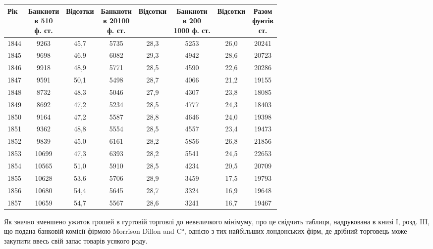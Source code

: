 
\begin{table}[h]
  \small
  \begin{tabular}{l c c c c c c c}
  \toprule
Рік  &  \makecell{Банкноти\\ в 5\textendash{}10 \\ф. ст.} & Відсотки  &
\makecell{Банкноти\\ в 20\textendash{}100\\ ф. ст.} & Відсотки  &  \makecell{Банкноти\\ в 200\textendash{}\\1000
ф. ст.} & Відсотки &   \makecell{Разом\\  фунтів \\ ст.} \\
  \midrule
1844    &     \phantom{0}9263  &  45,7  &  5735 & 28,3 & 5253 &   26,0 &   20241\\
1845    &     \phantom{0}9698  &  46,9  &  6082 & 29,3 & 4942 &   28,6 &   20723\\
1846    &     \phantom{0}9918  &  48,9  &  5771 & 28,5 & 4590 &   22,6 &   20286\\
1847    &     \phantom{0}9591  &  50,1  &  5498 & 28,7 & 4066 &   21,2 &   19155\\
1848    &     \phantom{0}8732  &  48,3  &  5046 & 27,9 & 4307 &   23,8 &   18085\\
1849    &     \phantom{0}8692  &  47,2  &  5234 & 28,5 & 4777 &   24,3 &   18403\\
1850    &     \phantom{0}9164  &  47,2  &  5587 & 28,8 & 4646 &   24,0 &   19398\\
1851    &     \phantom{0}9362  &  48,8  &  5554 & 28,5 & 4557 &   23,4 &   19473\\
1852    &     \phantom{0}9839  &  45,0  &  6161 & 28,2 & 5856 &   26,8 &   21856\\
1853    &     10699 &  47,3  &  6393 & 28,2 & 5541 &   24,5 &   22653\\
1854    &     10565 &  51,0  &  5910 & 28,5 & 4234 &   20,5 &   20709\\
1855    &     10628 &  53,6  &  5706 & 28,9 & 3459 &   17,5 &   19793\\
1856    &     10680 &  54,4  &  5645 & 28,7 & 3324 &   16,9 &   19648\\
1857    &     10659 &  54,7  &  5567 & 28,6 & 3241 &   16,7 &   19467\\
\end{tabular}
\end{table}
Як значно зменшено ужиток грошей в гуртовій торговлі до невеличкого
мінімуму, про це свідчить таблиця, надрукована в книзі І, розд. III,
що подана банковій комісії фірмою Morrison Dillon and C°, однією з тих найбільших
лондонських фірм, де дрібний торговець може закупити ввесь свій запас
товарів усякого роду.

